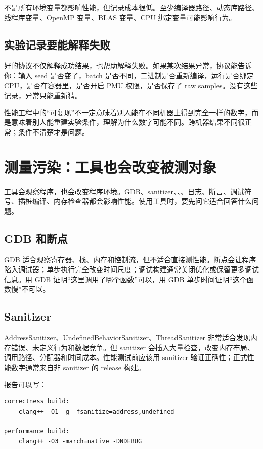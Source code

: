不是所有环境变量都影响性能，但记录成本很低。至少编译器路径、动态库路径、线程库变量、OpenMP 变量、BLAS 变量、CPU 绑定变量可能影响行为。

\subsection{实验记录要能解释失败}

好的协议不仅解释成功结果，也帮助解释失败。如果某次结果异常，协议能告诉你：输入 seed 是否变了，batch 是否不同，二进制是否重新编译，运行是否绑定 CPU，是否在容器里，是否开启 PMU 权限，是否保存了 raw samples。没有这些记录，异常只能重新猜。

性能工程中的“可复现”不一定意味着别人能在不同机器上得到完全一样的数字，而是意味着别人能重建实验条件，理解为什么数字可能不同。跨机器结果不同很正常；条件不清楚才是问题。

\section{测量污染：工具也会改变被测对象}

工具会观察程序，也会改变程序环境。GDB、sanitizer、、、日志、断言、调试符号、插桩编译、内存检查器都会影响性能。使用工具时，要先问它适合回答什么问题。

\subsection{GDB 和断点}

GDB 适合观察寄存器、栈、内存和控制流，但不适合直接测性能。断点会让程序陷入调试器；单步执行完全改变时间尺度；调试构建通常关闭优化或保留更多调试信息。用 GDB 证明“这里调用了哪个函数”可以，用 GDB 单步时间证明“这个函数慢”不可以。

\subsection{Sanitizer}

AddressSanitizer、UndefinedBehaviorSanitizer、ThreadSanitizer 非常适合发现内存错误、未定义行为和数据竞争。但 sanitizer 会插入大量检查，改变内存布局、调用路径、分配器和时间成本。性能测试前应该用 sanitizer 验证正确性；正式性能数字通常来自非 sanitizer 的 release 构建。

报告可以写：

\begin{lstlisting}
correctness build:
    clang++ -O1 -g -fsanitize=address,undefined

performance build:
    clang++ -O3 -march=native -DNDEBUG
\end{lstlisting}


